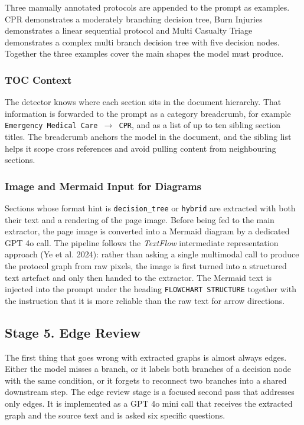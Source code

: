 \documentclass{article}
\begin{document}
Three manually annotated protocols are appended to the prompt as
examples. CPR demonstrates a moderately branching decision tree, Burn
Injuries demonstrates a linear sequential protocol and Multi Casualty
Triage demonstrates a complex multi branch decision tree with five
decision nodes. Together the three examples cover the main shapes the
model must produce.

\subsubsection{TOC Context}

The detector knows where each section sits in the document hierarchy.
That information is forwarded to the prompt as a category breadcrumb,
for example \texttt{Emergency Medical Care~$\rightarrow$~CPR}, and as
a list of up to ten sibling section titles. The breadcrumb anchors
the model in the document, and the sibling list helps it scope cross
references and avoid pulling content from neighbouring sections.

\subsubsection{Image and Mermaid Input for Diagrams}

Sections whose format hint is \texttt{decision\_tree} or
\texttt{hybrid} are extracted with both their text and a rendering of
the page image. Before being fed to the main extractor, the page image
is converted into a Mermaid diagram by a dedicated GPT 4o call. The
pipeline follows the \emph{TextFlow} intermediate representation
approach (Ye et al. 2024): rather than asking a single multimodal call
to produce the protocol graph from raw pixels, the image is first
turned into a structured text artefact and only then handed to the
extractor. The Mermaid text is injected into the prompt under the
heading \texttt{FLOWCHART~STRUCTURE} together with the instruction
that it is more reliable than the raw text for arrow directions.

\subsection{Stage 5. Edge Review}

The first thing that goes wrong with extracted graphs is almost always
edges. Either the model misses a branch, or it labels both branches of
a decision node with the same condition, or it forgets to reconnect
two branches into a shared downstream step. The edge review stage is a
focused second pass that addresses only edges. It is implemented as a
GPT 4o mini call that receives the extracted graph and the source text
and is asked six specific questions.
\end{document}
